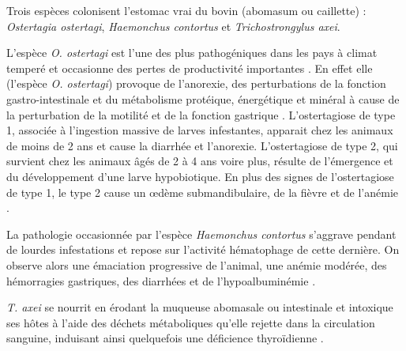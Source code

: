 \par Trois espèces colonisent l'estomac vrai du bovin (abomasum ou caillette) : 
\textit{Ostertagia ostertagi}, \textit{Haemonchus contortus} et \textit{Trichostrongylus axei}. 
\par L'espèce \textit{O. ostertagi} est l'une des plus pathogéniques dans les pays à 
climat temperé et occasionne des pertes de productivité importantes . 
En effet elle (l'espèce \textit{O. ostertagi}) provoque de l'anorexie, des perturbations 
de la fonction gastro-intestinale et du métabolisme protéique, énergétique et minéral à 
cause de la perturbation de la motilité et de la fonction gastrique . 
L'ostertagiose de type 1, associée à l'ingestion massive de larves infestantes, apparait 
chez les animaux de moins de 2 ans et cause la diarrhée et l'anorexie. L'ostertagiose 
de type 2, qui survient chez les animaux âgés de 2 à 4 ans voire plus, résulte de 
l'émergence et du développement d'une larve hypobiotique. En plus des signes de 
l'ostertagiose de type 1, le type 2 cause un  \oe dème submandibulaire, de la fièvre 
et de l'anémie . 
\par La pathologie occasionnée par l'espèce \textit{Haemonchus contortus} s'aggrave 
pendant de lourdes infestations et repose sur l'activité hématophage de cette dernière. 
On observe alors une émaciation progressive de l'animal, une anémie modérée, des 
hémorragies gastriques, des diarrhées et de l'hypoalbuminémie . 
\par \textit{T. axei} se nourrit en érodant la muqueuse abomasale ou intestinale et 
intoxique ses hôtes à l'aide des déchets métaboliques qu'elle rejette dans la circulation 
sanguine, induisant ainsi quelquefois une déficience thyroïdienne .

